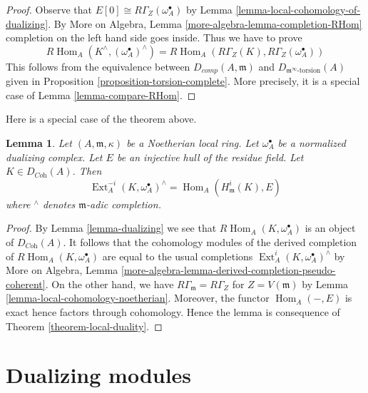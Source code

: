 \documentclass{stacks-project}
\theoremstyle{plain}
\newtheorem{lemma}[subsection]{Lemma}
\theoremstyle{definition}
\theoremstyle{remark}
\numberwithin{equation}{subsection}
\def\Hom{\mathop{\mathrm{Hom}}\nolimits}
\def\Ext{\mathop{\mathrm{Ext}}\nolimits}
\begin{document}
\begin{proof}
Observe that $E[0] \cong R\Gamma_Z(\omega_A^\bullet)$ by
Lemma \ref{lemma-local-cohomology-of-dualizing}.
By More on Algebra, Lemma \ref{more-algebra-lemma-completion-RHom}
completion on the left hand side goes inside.
Thus we have to prove
$$
R\Hom_A(K^\wedge, (\omega_A^\bullet)^\wedge)
=
R\Hom_A(R\Gamma_Z(K), R\Gamma_Z(\omega_A^\bullet))
$$
This follows from the equivalence between
$D_{comp}(A, \mathfrak m)$ and $D_{\mathfrak m^\infty\text{-torsion}}(A)$
given in Proposition \ref{proposition-torsion-complete}.
More precisely, it is a special case of Lemma \ref{lemma-compare-RHom}.
\end{proof}

\noindent
Here is a special case of the theorem above.

\begin{lemma}
\label{lemma-special-case-local-duality}
Let $(A, \mathfrak m, \kappa)$ be a Noetherian local ring.
Let $\omega_A^\bullet$ be a normalized dualizing complex.
Let $E$ be an injective hull of the residue field.
Let $K \in D_{\textit{Coh}}(A)$. Then
$$
\Ext^{-i}_A(K, \omega_A^\bullet)^\wedge =
\Hom_A(H^i_{\mathfrak m}(K), E)
$$
where ${}^\wedge$ denotes $\mathfrak m$-adic completion.
\end{lemma}

\begin{proof}
By Lemma \ref{lemma-dualizing} we see that $R\Hom_A(K, \omega_A^\bullet)$
is an object of $D_{\textit{Coh}}(A)$.
It follows that the cohomology modules of the derived completion
of $R\Hom_A(K, \omega_A^\bullet)$ are equal to the usual completions
$\Ext^i_A(K, \omega_A^\bullet)^\wedge$ by
More on Algebra, Lemma
\ref{more-algebra-lemma-derived-completion-pseudo-coherent}.
On the other hand, we have $R\Gamma_{\mathfrak m} = R\Gamma_Z$
for $Z = V(\mathfrak m)$ by Lemma \ref{lemma-local-cohomology-noetherian}.
Moreover, the functor $\Hom_A(-, E)$ is exact hence
factors through cohomology.
Hence the lemma is consequence of
Theorem \ref{theorem-local-duality}.
\end{proof}





\section{Dualizing modules}
\label{section-dualizing-module}
\end{document}
